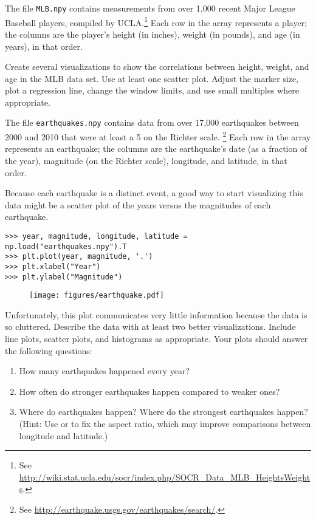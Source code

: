 \begin{problem} %
The file \texttt{MLB.npy} contains measurements from over 1,000 recent Major League Baseball players, compiled by UCLA.\footnote{See \url{http://wiki.stat.ucla.edu/socr/index.php/SOCR_Data_MLB_HeightsWeights}.}
Each row in the array represents a player; the columns are the player's height (in inches), weight (in pounds), and age (in years), in that order.

Create several visualizations to show the correlations between height, weight, and age in the MLB data set.
Use at least one scatter plot.
Adjust the marker size, plot a regression line, change the window limits, and use small multiples where appropriate.
\end{problem}

\begin{problem} %
The file \texttt{earthquakes.npy} contains data from over 17,000 earthquakes between 2000 and 2010 that were at least a 5 on the Richter scale.%
\footnote{See \url{http://earthquake.usgs.gov/earthquakes/search/}.}
Each row in the array represents an earthquake;
the columns are the earthquake's date (as a fraction of the year), magnitude (on the Richter scale), longitude, and latitude, in that order.

Because each earthquake is a distinct event, a good way to start visualizing this data might be a scatter plot of the years versus the magnitudes of each earthquake.

\begin{lstlisting}
>>> year, magnitude, longitude, latitude = np.load("earthquakes.npy").T
>>> plt.plot(year, magnitude, '.')
>>> plt.xlabel("Year")
>>> plt.ylabel("Magnitude")
\end{lstlisting}

\begin{figure}[H] %
    \centering
    \texttt{[image: figures/earthquake.pdf]}
\end{figure}

Unfortunately, this plot communicates very little information because the data is so cluttered.
Describe the data with at least two better visualizations. 
Include line plots, scatter plots, and histograms as appropriate.
Your plots should answer the following questions:
\begin{enumerate}
    \item How many earthquakes happened every year?
    \item How often do stronger earthquakes happen compared to weaker ones?
    \item Where do earthquakes happen? Where do the strongest earthquakes happen?
    \\(Hint: Use  or  to fix the aspect ratio, which may improve comparisons between longitude and latitude.)
\end{enumerate}
\end{problem}

